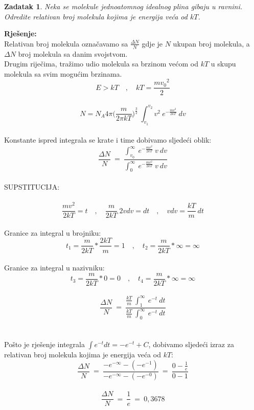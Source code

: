 \documentclass[a4paper,12pt]{article}
\newtheorem{ZDK}{Zadatak}[section]
\begin{document}
\newpage
\begin{ZDK}
	Neka se molekule jednoatomnog idealnog plina gibaju u ravnini. \\
	Odredite relativan broj molekula kojima je energija ve\'ca od $kT$.
\end{ZDK}
\textbf{Rje\v{s}enje:} \\
\newline
Relativan broj molekula ozna\v{c}avamo sa $\frac{\Delta N}{N}$ gdje je $N$ ukupan broj molekula, a $\Delta N$ broj molekula sa danim svojstvom. \\
Drugim rije\v{c}ima, tra\v{z}imo udio molekula sa brzinom ve\'com od $kT$ u skupu molekula sa svim mogu\'cim brzinama.
\\
$$ E>kT \quad , \quad kT=\frac{m{v_0}^2}{2} $$
\\
$$ N=N_A4\pi \Big( \frac{m}{2\pi kT} \Big)^{\frac{3}{2}}\ \int_{v_1}^{v_2}v^2\ e^{-\frac{mv^2}{2kT}}\ dv $$
\\
Konstante ispred integrala se krate i time dobivamo sljede\'ci oblik:
\\
$$ \frac{\Delta N}{N}\ =\ \frac{\int_{v_0}^{\infty}\ e^{-\frac{mv^2}{2kT}}\ v\ dv}{\int_{0}^{\infty}\ e^{-\frac{mv^2}{2kT}}\ v\ dv} $$
\\
SUPSTITUCIJA: \\
\\
$$ \frac{mv^2}{2kT}=t \quad,\quad \frac{m}{2kT}\ 2vdv=dt \quad,\quad vdv=\frac{kT}{m}\ dt $$
\\
Granice za integral u brojniku: 
$$ t_1=\frac{m}{2kT}*\frac{2kT}{m}=1 \quad,\quad t_2=\frac{m}{2kT}*\infty=\infty $$
\\
Granice za integral u nazivniku:
$$ t_3=\frac{m}{2kT}*0=0 \quad,\quad t_4=\frac{m}{2kT}*\infty=\infty $$
\\
$$ \frac{\Delta N}{N}\ =\ \frac{\frac{kT}{m}\ \int_{1}^{\infty}\ e^{-t}\ dt}{\frac{kT}{m}\ \int_{0}^{\infty}\ e^{-t}\ dt} $$
\\
\\
Po\v{s}to je rje\v{s}enje integrala $\int e^{-t}dt=-e^{-t}+C$, dobivamo sljede\'ci izraz za relativan broj molekula kojima je energija ve\'ca od $kT$:
\\
$$ \frac{\Delta N}{N}\ =\ \frac{-e^{-\infty}-(-e^{-1})}{-e^{-\infty}-(-e^{-0})}\ =\ \frac{0-\frac{1}{e}}{0-1} $$
\\
$$ \frac{\Delta N}{N}\ =\ \frac{1}{e}\ =\ 0,3678 $$
\end{document}
